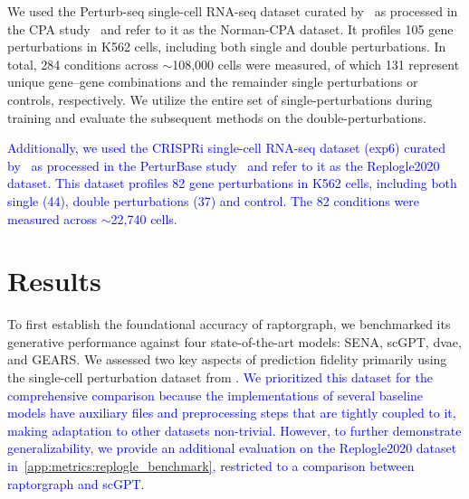 \documentclass{article}
\begin{document}
We used the Perturb-seq single-cell RNA-seq dataset curated by~\citet{norman2019exploring} as processed in the CPA study~\citep{lotfollahi_predicting_2023} and refer to it as the Norman-CPA dataset.
It profiles 105 gene perturbations in K562 cells, including both single and double perturbations.
In total, 284 conditions across $\sim$108{,}000 cells were measured, of which 131 represent unique gene–gene combinations and the remainder single perturbations or controls, respectively.
We utilize the entire set of single-perturbations during training and evaluate the subsequent methods on the double-perturbations.

\textcolor{blue}{Additionally, we used the CRISPRi single-cell RNA-seq dataset (exp6) curated by~\citet{replogle_combinatorial_2020} as processed in the PerturBase study~\citep{wei_perturbase_2024} and refer to it as the Replogle2020 dataset.
This dataset profiles 82 gene perturbations in K562 cells, including both single (44), double perturbations (37) and control.
The 82 conditions were measured across $\sim$22{,}740 cells.}

\section{Results}
\label{sec:results}
To first establish the foundational accuracy of \gls{raptorgraph}, we benchmarked its generative performance against four state-of-the-art models: SENA, scGPT, \gls{dvae}, and GEARS.
We assessed two key aspects of prediction fidelity primarily using the single-cell perturbation dataset from \citet{norman2019exploring}.
\textcolor{blue}{We prioritized this dataset for the comprehensive comparison because the implementations of several baseline models have auxiliary files and preprocessing steps that are tightly coupled to it, making adaptation to other datasets non-trivial.
However, to further demonstrate generalizability, we provide an additional evaluation on the Replogle2020 dataset in~\cref{app:metrics:replogle_benchmark}, restricted to a comparison between \gls{raptorgraph} and scGPT.}
\end{document}
